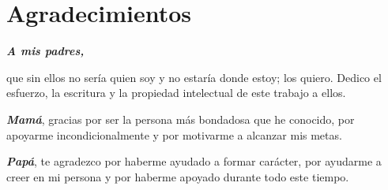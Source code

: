 \chapter*{Agradecimientos}
\textit{\textbf{\large{A mis padres,}}}

que sin ellos no sería quien soy y no estaría donde estoy; los quiero. Dedico el esfuerzo, la escritura y la propiedad intelectual de este trabajo a ellos.

\textit{\textbf{Mamá}}, gracias por ser la persona más bondadosa que he conocido, por apoyarme incondicionalmente y por motivarme a alcanzar mis metas.

\textit{\textbf{Papá}}, te agradezco por haberme ayudado a formar carácter, por ayudarme a creer en mi persona y por haberme apoyado durante todo este tiempo.


